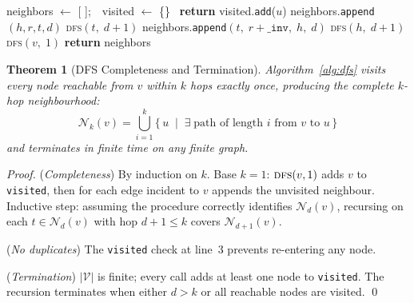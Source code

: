 \documentclass[12pt, a4paper]{article}
\theoremstyle{definition}
\theoremstyle{plain}
\newtheorem{theorem}{Theorem}[section]
\theoremstyle{remark}
\begin{document}
\begin{algorithm}[H]
\caption{$k$-hop DFS Neighbourhood --- Algorithm 1}
\label{alg:dfs}
\begin{algorithmic}[1]
  \State neighbors $\gets$ [ ];\ \ visited $\gets$ \{\}
    \ \textbf{return}\EndIf
    \State visited.\texttt{add}($u$)
        \State neighbors.\texttt{append}$(h, r, t, d)$ 
        \State \textsc{dfs}$(t,\;d+1)$
        \State neighbors.\texttt{append}$(t,\;r\!+\!\texttt{\_inv},\;h,\;d)$
        \State \textsc{dfs}$(h,\;d+1)$
      \EndIf
    \EndFor
  \EndProcedure
  \State \textsc{dfs}$(v,\;1)$
  \State \textbf{return} neighbors
\EndProcedure
\end{algorithmic}
\end{algorithm}

\begin{theorem}[DFS Completeness and Termination]
\label{thm:dfs}
Algorithm~\ref{alg:dfs} visits every node reachable from $v$ within $k$ hops
exactly once, producing the complete $k$-hop neighbourhood:
\[
  \mathcal{N}_k(v) = \bigcup_{i=1}^{k}
  \bigl\{\,u \;\mid\; \exists\;\text{path of length }i\text{ from }v\text{ to }u\,\bigr\}
\]
and terminates in finite time on any finite graph.
\end{theorem}

\begin{proof}
(\textit{Completeness}) By induction on $k$.  Base $k=1$: $\textsc{dfs}(v,1)$
adds $v$ to \texttt{visited}, then for each edge incident to $v$ appends the
unvisited neighbour.  Inductive step: assuming the procedure correctly
identifies $\mathcal{N}_{d}(v)$, recursing on each $t \in \mathcal{N}_d(v)$
with hop $d+1 \leq k$ covers $\mathcal{N}_{d+1}(v)$.

(\textit{No duplicates}) The \texttt{visited} check at line~3 prevents
re-entering any node.

(\textit{Termination}) $|\mathcal{V}|$ is finite; every call adds at least
one node to \texttt{visited}.  The recursion terminates when either $d > k$
or all reachable nodes are visited.  \qed
\end{proof}
\end{document}
